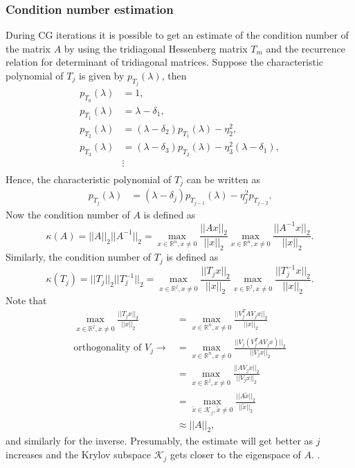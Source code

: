 \subsubsection{Condition number estimation} \label{sec:cg_condition_number_estimate}
During CG iterations it is possible to get an estimate of the condition number of the matrix $A$ by using the tridiagonal Hessenberg matrix $T_m$ and the recurrence relation for determinant of tridiagonal matrices. Suppose the characteristic polynomial of $T_j$ is given by $p_{T_j}(\lambda)$, then
\begin{align*}
  p_{T_0}(\lambda) & = 1,                                                                   \\
  p_{T_1}(\lambda) & = \lambda - \delta_1,                                                  \\
  p_{T_2}(\lambda) & = (\lambda - \delta_2)p_{T_1}(\lambda) - \eta_2^2,                     \\
  p_{T_3}(\lambda) & = (\lambda - \delta_3)p_{T_2}(\lambda) - \eta_3^2(\lambda - \delta_1), \\
                   & \vdots                                                                 \\
\end{align*}
Hence, the characteristic polynomial of $T_j$ can be written as
\begin{align}
  p_{T_j}(\lambda) & = (\lambda - \delta_j)p_{T_{j-1}}(\lambda) - \eta_j^2p_{T_{j-2}}
  \label{eq:cg_hessenberg_char_poly}.
\end{align}
Now the condition number of $A$ is defined as
\[
  \kappa(A) = ||A||_2 ||A^{-1}||_2 = \max_{x\in\mathbb{R}^n, x\neq0} \frac{||Ax||_2}{||x||_2} \max_{x\in\mathbb{R}^n, x\neq0} \frac{||A^{-1}x||_2}{||x||_2}.
\]
Similarly, the condition number of $T_j$ is defined as
\[
  \kappa(T_j) = ||T_j||_2 ||T_j^{-1}||_2 = \max_{x\in\mathbb{R}^j, x\neq0} \frac{||T_jx||_2}{||x||_2} \max_{x\in\mathbb{R}^j, x\neq0} \frac{||T_j^{-1}x||_2}{||x||_2}.
\]
Note that
\begin{align*}
  \max_{x\in\mathbb{R}^j, x\neq0} \frac{||T_jx||_2}{||x||_2} & = \max_{x\in\mathbb{R}^n, x\neq0} \frac{||V_j^T A V_j x||_2}{||x||_2}                        \\
  \text{orthogonality of } V_j \rightarrow                   & = \max_{x\in\mathbb{R}^n, x\neq0} \frac{||V_j(V_j^T A V_j x)||_2}{||V_j x||_2}               \\
                                                             & = \max_{x\in\mathbb{R}^j, x\neq0} \frac{||A V_j x||_2}{||V_j x||_2}                          \\
                                                             & = \max_{\tilde{x}\in\mathcal{K}_j, \tilde{x}\neq0} \frac{||A \tilde{x}||_2}{||\tilde{x}||_2} \\
                                                             & \approx ||A||_2,
\end{align*}
and similarly for the inverse. Presumably, the estimate will get better as $j$ increases and the Krylov subspace $\mathcal{K}_j$ gets closer to the eigenspace of $A$. .


